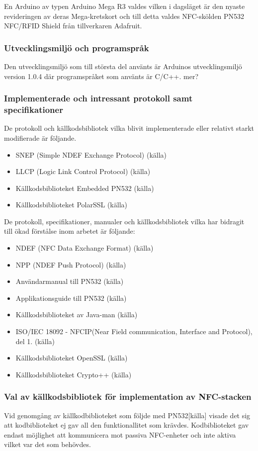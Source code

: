 \documentclass[11pt]{article}
\begin{document}
En Arduino av typen Arduino Mega R3 valdes vilken i dagsläget är den nyaste revideringen av deras Mega-kretskort och till detta valdes NFC-skölden PN532 NFC/RFID Shield från tillverkaren Adafruit.

\subsubsection{Utvecklingsmiljö och programspråk}
Den utvecklingsmiljö som till största del använts är Arduinos utvecklingsmiljö version 1.0.4 där programspråket som använts är C/C++. mer?

\subsubsection{Implementerade och intressant protokoll samt specifikationer}
De protokoll och källkodsbibliotek vilka blivit implementerade eller relativt starkt modifierade är följande.
\begin{itemize}
\item SNEP (Simple NDEF Exchange Protocol) (källa)
\item LLCP (Logic Link Control Protocol) (källa)
\item Källkodsbiblioteket Embedded PN532 (källa)
\item Källkodsbiblioteket PolarSSL (källa)
\end{itemize}
De protokoll, specifikationer, manualer och källkodsbibliotek vilka har bidragit till ökad förstålse inom arbetet är följande:
\begin{itemize}
\item NDEF (NFC Data Exchange Format) (källa)
\item NPP (NDEF Push Protocol) (källa)
\item Användarmanual till PN532 (källa)
\item Applikationsguide till PN532 (källa)
\item Källkodsbiblioteket av Java-man (källa)
\item ISO/IEC 18092 - NFCIP(Near Field communication, Interface and Protocol), del 1. (källa)
\item Källkodsbiblioteket OpenSSL (källa)
\item Källkodsbiblioteket Crypto++ (källa)
\end{itemize}

\subsubsection{Val av källkodsbibliotek för implementation av NFC-stacken}
Vid genomgång av källkodbiblioteket som följde med PN532[källa] visade det sig att kodbiblioteket ej gav all den funktionallitet som krävdes. Kodbiblioteket gav endast möjlighet att kommunicera mot passiva NFC-enheter och inte aktiva vilket var det som behövdes. 
\end{document}
